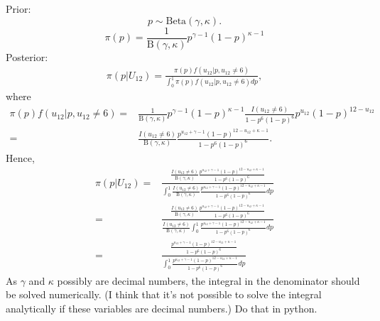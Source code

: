 \documentclass{article}
\begin{document}
Prior:
\begin{equation*}
    p \sim \text{Beta}(\gamma,\kappa).
\end{equation*}
\begin{equation*}
    \pi(p) = \frac{1}{\text{B}(\gamma,\kappa)}p^{\gamma-1}(1-p)^{\kappa-1}
\end{equation*}
Posterior:
\begin{equation*}
    \begin{aligned}
        \pi(p|U_{12}) = \frac{\pi(p)f(u_{12}|p,u_{12}\neq6)}{\int_{0}^{1} \pi(p)f(u_{12}|p,u_{12}\neq6) dp},
    \end{aligned}
\end{equation*}
where
\begin{equation*}
    \begin{aligned}
        \pi(p)f(u_{12}|p, u_{12}\neq6) 
        = & \frac{1}{\text{B}(\gamma,\kappa)}p^{\gamma-1}(1-p)^{\kappa-1} \frac{I(u_{12}\neq6)}{1-p^6(1-p)^6}p^{u_{12}}(1-p)^{12-u_{12}}\\[6pt]
        = &\frac{I(u_{12}\neq6)}{\text{B}(\gamma,\kappa)}\frac{p^{u_{12}+\gamma-1}(1-p)^{12-u_{12}+\kappa-1}}{1-p^6(1-p)^6}.
    \end{aligned}
\end{equation*}
Hence,
\begin{equation*}
    \begin{aligned}
        \pi(p|U_{12}) 
        =&\frac{\frac{I(u_{12}\neq6)}{\text{B}(\gamma,\kappa)}\frac{p^{u_{12}+\gamma-1}(1-p)^{12-u_{12}+\kappa-1}}{1-p^6(1-p)^6}}{\int_0^1 \frac{I(u_{12}\neq6)}{\text{B}(\gamma,\kappa)}\frac{p^{u_{12}+\gamma-1}(1-p)^{12-u_{12}+\kappa-1}}{1-p^6(1-p)^6} dp} \\[6pt]
        =&\frac{\frac{I(u_{12}\neq6)}{\text{B}(\gamma,\kappa)}\frac{p^{u_{12}+\gamma-1}(1-p)^{12-u_{12}+\kappa-1}}{1-p^6(1-p)^6}}
        {\frac{I(u_{12}\neq6)}{\text{B}(\gamma,\kappa)}\int_0^1 \frac{p^{u_{12}+\gamma-1}(1-p)^{12-u_{12}+\kappa-1}}{1-p^6(1-p)^6} dp}\\[6pt]
        =&\frac{\frac{p^{u_{12}+\gamma-1}(1-p)^{12-u_{12}+\kappa-1}}{1-p^6(1-p)^6}}
        {\int_0^1 \frac{p^{u_{12}+\gamma-1}(1-p)^{12-u_{12}+\kappa-1}}{1-p^6(1-p)^6} dp}
    \end{aligned}
\end{equation*}
As $\gamma$ and $\kappa$ possibly are decimal numbers, the integral in the denominator should be solved numerically. (I think that it's not possible to solve the integral analytically if these variables are decimal numbers.) Do that in python. 
\end{document}
